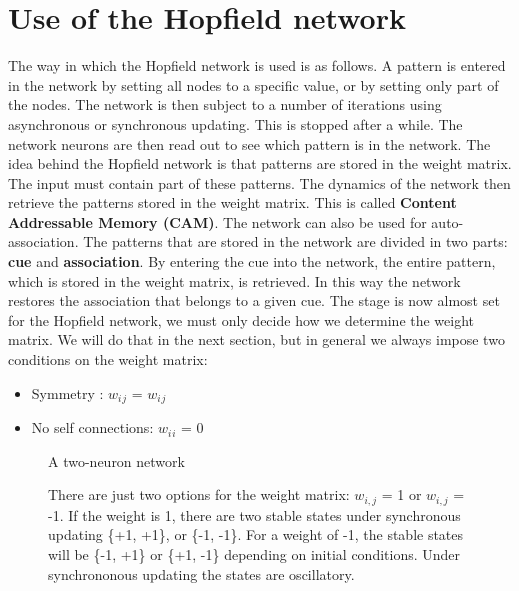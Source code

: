\documentclass[12pt, right open]{memoir}
\begin{document}
\section {Use of the Hopfield network}
The way in which the Hopfield network is used is as follows. 
A pattern is entered in the network by setting all nodes to a specific value, or by setting
only part of the nodes. The network is then subject to a number of iterations
using asynchronous or synchronous updating. This is stopped after a while.
The network neurons are then read out to see which pattern is in the network.
The idea behind the Hopfield network is that patterns are stored in the
weight matrix. The input must contain part of these patterns. The dynamics
of the network then retrieve the patterns stored in the weight matrix. This is
called \textbf{Content Addressable Memory (CAM)}. The network can also be used for
auto-association. The patterns that are stored in the network are divided in two
parts: \textbf{cue} and \textbf{association}. By entering the cue into the network,
the entire pattern, which is stored in the weight matrix, is retrieved. In this
way the network restores the association that belongs to a given cue.
The stage is now almost set for the Hopfield network, we must only decide
how we determine the weight matrix. We will do that in the next section, but
in general we always impose two conditions on the weight matrix:
\begin{itemize}
\item Symmetry : $w$$_i$$_j$ = $w$$_i$$_j$
\item No self connections: $w$$_i$$_i$ = 0
\end{itemize}

\begin{figure}
\centering
\caption{A two-neuron network}
\caption{There are just two options for the weight
matrix: $w_{i,j}$ = 1  or $w_{i,j}$ = -1. If the weight is 1, there are two stable
states under synchronous updating \{+1, +1\}, or \{-1, -1\}. For a weight of -1,
the stable states will be \{-1, +1\} or \{+1, -1\} depending on initial conditions.
Under synchrononous updating the states are oscillatory.}
\label{fig:a_two_neuron_network}
\end{figure}
\end{document}
